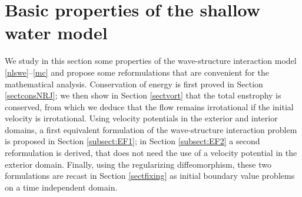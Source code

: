 \documentclass[JEP,XML,SOM,Unicode,NoFloatCountersInSection,published]{cedram}
\theoremstyle{definition}
\begin{document}
\section{Basic properties of the shallow water model}\label{sect:BP}
We study in this section some properties of the wave-structure interaction model \eqref{nlswe}--\eqref{mc} and
propose some reformulations that are convenient for the mathematical analysis.
Conservation of energy is first proved in Section \ref{sectconsNRJ};
we then show in Section \ref{sectvort} that the total enstrophy is conserved,
from which we deduce that the flow remains irrotational if the initial velocity is irrotational.
Using velocity potentials in the exterior and interior domains,
a first equivalent formulation of the wave-structure interaction problem is proposed in Section \ref{subsect:EF1};
in Section \ref{subsect:EF2} a second reformulation is derived, that does not need the use of a velocity potential in the exterior domain.
Finally, using the regularizing diffeomorphism, these two formulations are recast in Section \ref{sectfixing}
as initial boundary value problems on a time independent domain.
\end{document}
